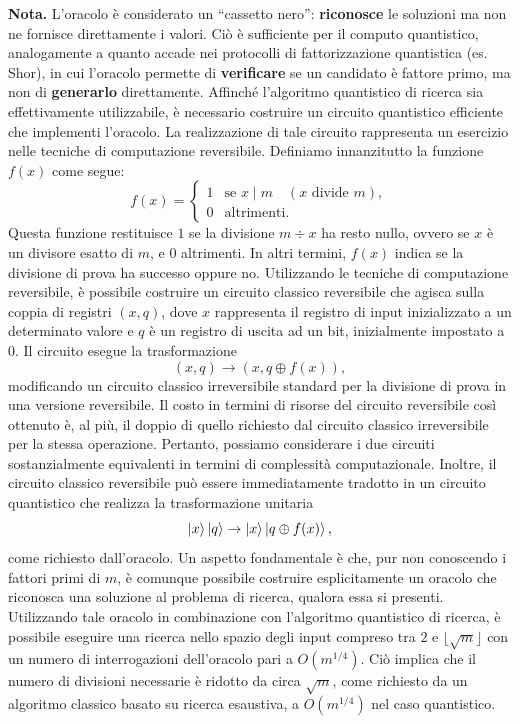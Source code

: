 \documentclass[a4paper,12pt]{report}
\theoremstyle{plain}
\begin{document}
\noindent \textbf{Nota.} L'oracolo è considerato un ``cassetto nero'': \textbf{riconosce} le soluzioni ma non ne fornisce direttamente i valori. Ciò è sufficiente per il computo quantistico, analogamente a quanto accade nei protocolli di fattorizzazione quantistica (es. Shor), in cui l'oracolo permette di \textbf{verificare} se un candidato è fattore primo, ma non di \textbf{generarlo} direttamente.
Affinché l'algoritmo quantistico di ricerca sia effettivamente utilizzabile, è necessario costruire un circuito quantistico efficiente che implementi l'oracolo. La realizzazione di tale circuito rappresenta un esercizio nelle tecniche di computazione reversibile.
Definiamo innanzitutto la funzione $f(x)$ come segue:
\[
f(x) = 
\begin{cases}
1 & \text{se } x \mid m  \quad (x \text{ divide } m), \\
0 & \text{altrimenti}.
\end{cases}
\]
Questa funzione restituisce $1$ se la divisione $m \div x$ ha resto nullo, ovvero se $x$ è un divisore esatto di $m$, e $0$ altrimenti. In altri termini, $f(x)$ indica se la divisione di prova ha successo oppure no.
Utilizzando le tecniche di computazione reversibile, è possibile costruire un circuito classico reversibile che agisca sulla coppia di registri $(x, q)$, dove $x$ rappresenta il registro di input inizializzato a un determinato valore e $q$ è un registro di uscita ad un bit, inizialmente impostato a $0$. Il circuito esegue la trasformazione
\[
(x, q) \rightarrow (x, q \oplus f(x)),
\]
modificando un circuito classico irreversibile standard per la divisione di prova in una versione reversibile.
Il costo in termini di risorse del circuito reversibile così ottenuto è, al più, il doppio di quello richiesto dal circuito classico irreversibile per la stessa operazione. Pertanto, possiamo considerare i due circuiti sostanzialmente equivalenti in termini di complessità computazionale.
Inoltre, il circuito classico reversibile può essere immediatamente tradotto in un circuito quantistico che realizza la trasformazione unitaria
\[
\ket{x}\ket{q} \rightarrow \ket{x}\ket{q \oplus f(x)},
\]
come richiesto dall'oracolo. Un aspetto fondamentale è che, pur non conoscendo i fattori primi di $m$, è comunque possibile costruire esplicitamente un oracolo che riconosca una soluzione al problema di ricerca, qualora essa si presenti.
Utilizzando tale oracolo in combinazione con l'algoritmo quantistico di ricerca, è possibile eseguire una ricerca nello spazio degli input compreso tra $2$ e $\lfloor \sqrt{m} \rfloor$ con un numero di interrogazioni dell'oracolo pari a $O(m^{1/4})$. Ciò implica che il numero di divisioni necessarie è ridotto da circa $\sqrt{m}$, come richiesto da un algoritmo classico basato su ricerca esaustiva, a $O(m^{1/4})$ nel caso quantistico.
\end{document}
